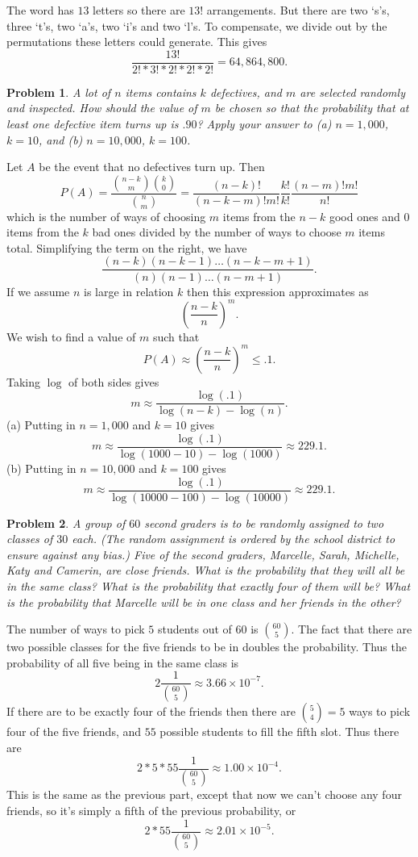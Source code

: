 \documentclass{article}
\newtheorem{problem}{Problem}
\begin{document}
The word has $13$ letters so there are $13!$ arrangements. But there are two `s's, three `t's, two `a's, two `i's and two `l's. To compensate, we divide out by the permutations these letters could generate. This gives
\[
\frac{13!}{2!*3!*2!*2!*2!} = 64,864,800.
\]

\begin{problem}
A lot of $n$ items contains $k$ defectives, and $m$ are selected randomly and inspected. How should the value of $m$ be chosen so that the probability that at least one defective item turns up is $.90$? Apply your answer to (a) $n = 1,000$, $k = 10$, and (b) $n = 10,000$, $k = 100$.
\end{problem}

Let $A$ be the event that no defectives turn up. Then
\[
P(A) = \frac{\binom{n-k}{m} \binom{k}{0}}{\binom{n}{m}} = \frac{(n-k)!}{(n-k-m)!m!} \frac{k!}{k!} \frac{(n-m)!m!}{n!}
\]
which is the number of ways of choosing $m$ items from the $n-k$ good ones and $0$ items from the $k$ bad ones divided by the number of ways to choose $m$ items total. Simplifying the term on the right, we have
\[
\frac{(n-k)(n-k-1) \dots (n-k-m+1)}{(n)(n-1) \dots (n-m+1)}.
\]
If we assume $n$ is large in relation $k$ then this expression approximates as
\[
\left ( \frac{n-k}{n} \right )^m.
\]
We wish to find a value of $m$ such that
\[
P(A) \approx \left ( \frac{n-k}{n} \right )^m \leq .1.
\]
Taking $\log$ of both sides gives
\[
m \approx \frac{\log(.1)}{\log(n-k) - \log(n)}.
\]
(a) Putting in $n = 1,000$ and $k = 10$ gives
\[
m \approx \frac{\log(.1)}{\log(1000-10) - \log(1000)} \approx 229.1.
\]
(b) Putting in $n = 10,000$ and $k = 100$ gives
\[
m \approx \frac{\log(.1)}{\log(10000-100) - \log(10000)} \approx 229.1.
\]

\begin{problem}
A group of $60$ second graders is to be randomly assigned to two classes of $30$ each. (The random assignment is ordered by the school district to ensure against any bias.) Five of the second graders, Marcelle, Sarah, Michelle, Katy and Camerin, are close friends. What is the probability that they will all be in the same class? What is the probability that exactly four of them will be? What is the probability that Marcelle will be in one class and her friends in the other?
\end{problem}

The number of ways to pick $5$ students out of $60$ is $\binom{60}{5}$. The fact that there are two possible classes for the five friends to be in doubles the probability. Thus the probability of all five being in the same class is
\[
2 \frac{1}{\binom{60}{5}} \approx 3.66 \times 10^{-7}.
\]
If there are to be exactly four of the friends then there are $\binom{5}{4} = 5$ ways to pick four of the five friends, and $55$ possible students to fill the fifth slot. Thus there are
\[
2 * 5 * 55 \frac{1}{\binom{60}{5}} \approx 1.00 \times 10^{-4}.
\]
This is the same as the previous part, except that now we can't choose any four friends, so it's simply a fifth of the previous probability, or
\[
2 * 55 \frac{1}{\binom{60}{5}} \approx 2.01 \times 10^{-5}.
\]
\end{document}
